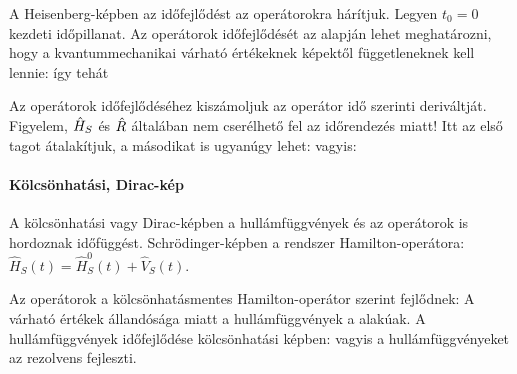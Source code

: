     A Heisenberg-képben az időfejlődést az operátorokra hárítjuk. Legyen $t_0=0$ kezdeti időpillanat. Az operátorok időfejlődését az alapján lehet meghatározni, hogy a kvantummechanikai várható értékeknek képektől függetleneknek kell lennie:
    így tehát
    
    Az operátorok időfejlődéséhez kiszámoljuk az operátor idő szerinti deriváltját. Figyelem, $\hat{H}_S$ és $\hat{R}$ általában nem cserélhető fel az időrendezés miatt!
    Itt az első tagot átalakítjuk, a másodikat is ugyanúgy lehet:
    vagyis:
   
   \paragraph{Kölcsönhatási, Dirac-kép}\label{ss:A01-dirac}
    A kölcsönhatási vagy Dirac-képben a hullámfüggvények és az operátorok is hordoznak időfüggést. Schrödinger-képben a rendszer Hamilton-operátora: $\hat{H}_S(t)=\hat{H}_S^0(t)+\hat{V}_S(t)$. 
   
    Az operátorok a kölcsönhatásmentes Hamilton-operátor szerint fejlődnek:
    A várható értékek állandósága miatt a hullámfüggvények a
    alakúak. A hullámfüggvények időfejlődése kölcsönhatási képben:
    vagyis a hullámfüggvényeket az 
    rezolvens fejleszti. 
   

